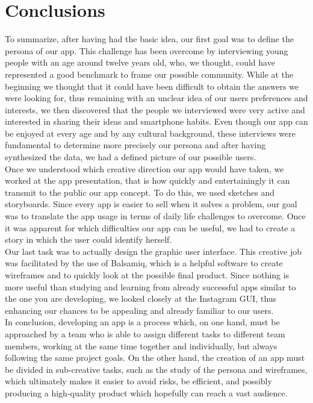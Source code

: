 \documentclass[12pt]{scrartcl}
\begin{document}
	
\section{Conclusions}

	
	To summarize, after having had the basic idea, our first goal was to define the persona of our app. This challenge has been overcome by interviewing young people with an age around twelve years old, who, we thought, could have represented a good benchmark to frame our possible community. While at the beginning we thought that it could have been difficult to obtain the answers we were looking for, thus remaining with an unclear idea of our users preferences and interests, we then discovered that the people we interviewed were very active and interested in sharing their ideas and smartphone habits. Even though our app can be enjoyed at every age and by any cultural background, these interviews were fundamental to determine more precisely our persona and after having synthesized the data, we had a defined picture of our possible users.\\
	
	Once we understood which creative direction our app would have taken, we worked at the app presentation, that is how quickly and entertainingly it can transmit to the public our app concept. To do this, we used sketches and storyboards. Since every app is easier to sell when it solves a problem, our goal was to translate the app usage in terms of daily life challenges to overcome. Once it was apparent for which difficulties our app can be useful, we had to create a story in which the user could identify herself.\\
  
	Our last task was to actually design the graphic user interface. This creative job was facilitated by the use of Balsamiq, which is a helpful software to create wireframes and to quickly look at the possible final product. Since nothing is more useful than studying and learning from already successful apps similar to the one you are developing, we looked closely at the Instagram GUI, thus enhancing our chances to be appealing and already familiar to our users.\\
  
	In conclusion, developing an app is a process which, on one hand, must be approached by a team who is able to assign different tasks to different team members, working at the same time together and individually, but always following the same project goals. On the other hand, the creation of an app must be divided in sub-creative tasks, such as the study of the persona and wireframes, which ultimately makes it easier to avoid risks, be efficient, and possibly producing a high-quality product which hopefully can reach a vast audience.\\
\end{document}
